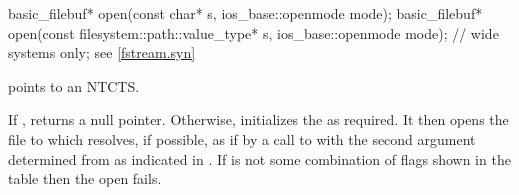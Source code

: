 %
\begin{itemdecl}
basic_filebuf* open(const char* s, ios_base::openmode mode);
basic_filebuf* open(const filesystem::path::value_type* s,
                    ios_base::openmode mode);  // wide systems only; see \ref{fstream.syn}
\end{itemdecl}

\begin{itemdescr}
\pnum
\expects
{} points to an NTCTS.

\pnum
\effects
If
,
returns a null pointer.
Otherwise,
initializes the
as required.
It then opens
the file to which  resolves, if possible,
as if by a call to 
%
with the second argument determined from
as indicated in .
If  is not some combination of flags shown in the table then
the open fails.


\end{itemdescr}
